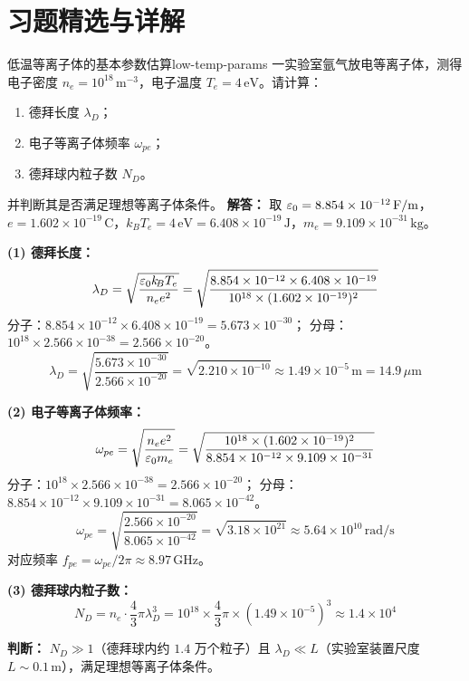 
\section*{习题精选与详解}
{}

\begin{example}{低温等离子体的基本参数估算}{low-temp-params}
一实验室氩气放电等离子体，测得电子密度 $n_e = 10^{18}\,\mathrm{m}^{-3}$，电子温度 $T_e = 4\,\mathrm{eV}$。请计算：
\begin{enumerate}[label=(\arabic*)]
\item 德拜长度 $\lambda_D$；
\item 电子等离子体频率 $\omega_{pe}$；
\item 德拜球内粒子数 $N_D$。
\end{enumerate}
并判断其是否满足理想等离子体条件。
\tcblower
\textbf{解答：}
取 $\varepsilon_0 = 8.854\times 10^{-12}\,\mathrm{F/m}$，$e=1.602\times 10^{-19}\,\mathrm{C}$，$k_{\!B}T_e = 4\,\mathrm{eV} = 6.408\times 10^{-19}\,\mathrm{J}$，$m_e = 9.109\times 10^{-31}\,\mathrm{kg}$。

\textbf{(1) 德拜长度：}
\[
\lambda_D = \sqrt{\frac{\varepsilon_0 k_{\!B}T_e}{n_e e^2}} = \sqrt{\frac{8.854\times 10^{-12}\times 6.408\times 10^{-19}}{10^{18}\times (1.602\times 10^{-19})^2}}
\]
分子：$8.854\times 10^{-12}\times 6.408\times 10^{-19} = 5.673\times 10^{-30}$；
分母：$10^{18}\times 2.566\times 10^{-38} = 2.566\times 10^{-20}$。
\[
\lambda_D = \sqrt{\frac{5.673\times 10^{-30}}{2.566\times 10^{-20}}} = \sqrt{2.210\times 10^{-10}} \approx 1.49\times 10^{-5}\,\mathrm{m} = 14.9\,\mu\mathrm{m}
\]

\textbf{(2) 电子等离子体频率：}
\[
\omega_{pe} = \sqrt{\frac{n_e e^2}{\varepsilon_0 m_e}} = \sqrt{\frac{10^{18}\times (1.602\times 10^{-19})^2}{8.854\times 10^{-12}\times 9.109\times 10^{-31}}}
\]
分子：$10^{18}\times 2.566\times 10^{-38} = 2.566\times 10^{-20}$；
分母：$8.854\times 10^{-12}\times 9.109\times 10^{-31} = 8.065\times 10^{-42}$。
\[
\omega_{pe} = \sqrt{\frac{2.566\times 10^{-20}}{8.065\times 10^{-42}}} = \sqrt{3.18\times 10^{21}} \approx 5.64\times 10^{10}\,\mathrm{rad/s}
\]
对应频率 $f_{pe} = \omega_{pe}/2\pi \approx 8.97\,\mathrm{GHz}$。

\textbf{(3) 德拜球内粒子数：}
\[
N_D = n_e \cdot \frac{4}{3}\pi \lambda_D^3 = 10^{18}\times \frac{4}{3}\pi\times(1.49\times 10^{-5})^3 \approx 1.4\times 10^{4}
\]

\textbf{判断：} $N_D\gg 1$（德拜球内约 $1.4$ 万个粒子）且 $\lambda_D\ll L$（实验室装置尺度 $L\sim 0.1\,\mathrm{m}$），满足理想等离子体条件。
\end{example}

